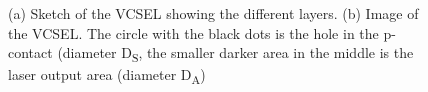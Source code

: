\begin{figure}[tp]
\begin{subfigure}[t]{ 0.49\linewidth}
			\caption{}
			\label{subfig::vcsel_output_area}
		\end{subfigure}
		\caption{(a) Sketch of the VCSEL showing the different layers. (b) Image of the VCSEL. The circle with the black dots is the hole in the p-contact (diameter D\textsubscript{S}, the smaller darker area in the middle is the laser output area (diameter D\textsubscript{A})}
		\label{fig::<fig>}
	\end{figure}

	\begin{figure}[tp]
		\begin{subfigure}[t]{ 0.49\linewidth}
			\centering
			\caption{}
			\label{subfig::vcsel_output_wavelength}
		\end{subfigure}
		\hfill
		\begin{subfigure}[t]{ 0.49\linewidth}

\end{subfigure}
\end{figure}
